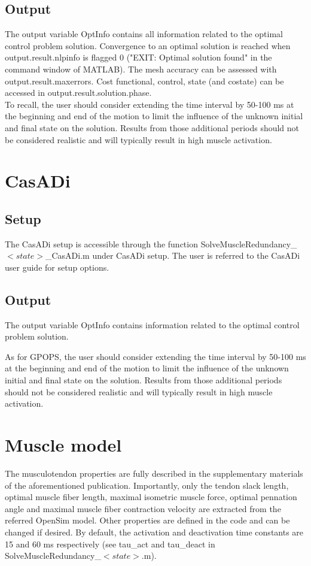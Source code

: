 \documentclass[a4paper,oneside,11pt]{article}
\begin{document}
\subsection{Output}

The output variable OptInfo contains all information related to the optimal control problem solution. Convergence to an optimal solution is reached when output.result.nlpinfo is flagged 0 ("EXIT: Optimal solution found" in the command window of MATLAB). The mesh accuracy can be assessed with output.result.maxerrors. Cost functional, control, state (and costate) can be accessed in output.result.solution.phase. \\

To recall, the user should consider extending the time interval by 50-100 ms at the beginning and end of the motion to limit the influence of the unknown initial and final state on the solution. Results from those additional periods should not be considered realistic and will typically result in high muscle activation.

\section{CasADi}
\subsection{Setup}
The CasADi setup is accessible through the function SolveMuscleRedundancy_$<state>$_CasADi.m under CasADi setup. The user is referred to the CasADi user guide for setup options.

\subsection{Output}
The output variable OptInfo contains information related to the optimal control problem solution.

As for GPOPS, the user should consider extending the time interval by 50-100 ms at the beginning and end of the motion to limit the influence of the unknown initial and final state on the solution. Results from those additional periods should not be considered realistic and will typically result in high muscle activation.

\section{Muscle model}

The musculotendon properties are fully described in the supplementary materials of the aforementioned publication. Importantly, only the tendon slack length, optimal muscle fiber length, maximal isometric muscle force, optimal pennation angle and maximal muscle fiber contraction velocity are extracted from the referred OpenSim model. Other properties are defined in the code and can be changed if desired. By default, the activation and deactivation time constants are 15 and 60 ms respectively (see tau_act and tau_deact in SolveMuscleRedundancy_$<state>$.m).
\end{document}
